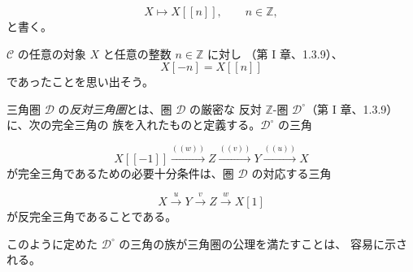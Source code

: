 \[
  X\longmapsto X[[n]],\qquad n\in\mathbb Z,
\]
と書く。

$\mathcal C$ の任意の対象 $X$ と任意の整数 $n\in\mathbb Z$ に対し
（第 I 章、1.3.9）、
\[
  X[-n]=X[[n]]
\]
であったことを思い出そう。

三角圏 $\mathcal D$ の\emph{反対三角圏}とは、圏 $\mathcal D$ の厳密な
反対 $\mathbb Z$-圏 $\mathcal D^\circ$（第 I 章、1.3.9）に、次の完全三角の
族を入れたものと定義する。$\mathcal D^\circ$ の三角

\[
  X[[-1]]\xrightarrow{((w))}Z\xrightarrow{((v))}Y
  \xrightarrow{((u))}X
\]
が完全三角であるための必要十分条件は、圏 $\mathcal D$ の対応する三角

\[
  X\xrightarrow{u}Y\xrightarrow{v}Z\xrightarrow{w}X[1]
\]
が反完全三角であることである。

このように定めた $\mathcal D^\circ$ の三角の族が三角圏の公理を満たすことは、
容易に示される。
\endgroup
